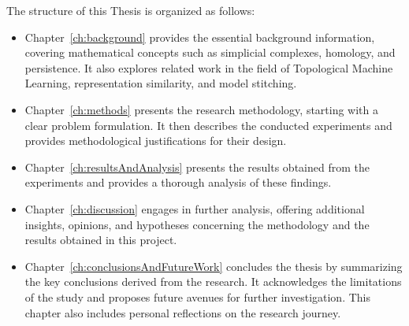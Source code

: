 \documentclass[../main.tex]{subfiles}
\begin{document}
The structure of this Thesis is organized as follows:
\begin{itemize}
    \item Chapter~\ref{ch:background} provides the essential background information, covering mathematical concepts such as simplicial complexes, homology, and persistence. It also explores related work in the field of Topological Machine Learning, representation similarity, and model stitching.

    \item Chapter~\ref{ch:methods} presents the research methodology, starting with a clear problem formulation. It then describes the conducted experiments and provides methodological justifications for their design.

    \item Chapter~\ref{ch:resultsAndAnalysis} presents the results obtained from the experiments and provides a thorough analysis of these findings.

    \item Chapter~\ref{ch:discussion} engages in further analysis, offering additional insights, opinions, and hypotheses concerning the methodology and the results obtained in this project.

    \item Chapter~\ref{ch:conclusionsAndFutureWork} concludes the thesis by summarizing the key conclusions derived from the research. It acknowledges the limitations of the study and proposes future avenues for further investigation. This chapter also includes personal reflections on the research journey.
\end{itemize}
\end{document}
